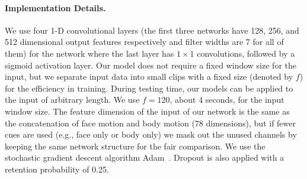 
\paragraph{Implementation Details.}
We use four 1-D convolutional layers (the first three networks have 128, 256, and 512 dimensional output features respectively and filter widths are 7 for all of them) for the network where the last layer has $1\times1$ convolutions, followed by a sigmoid activation layer. Our model does not require a fixed window size for the input, but we separate input data into small clips with a fixed size (denoted by $f$) for the efficiency in training. During testing time, our models can be applied to the input of arbitrary length. We use $f=120$, about 4 seconds, for the input window size. The feature dimension of the input of our network is the same as the concatenation of face motion and body motion (78 dimensions), but if fewer cues are used (e.g., face only or body only) we mask out the unused channels by keeping the same network structure for the fair comparison. We use the stochastic gradient descent algorithm Adam~\cite{kingma2014adam}. Dropout is also applied with a retention probability of 0.25.  



